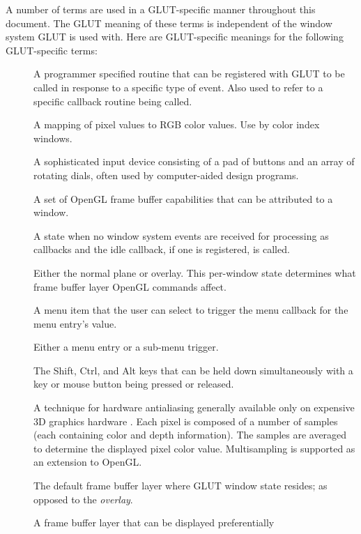 \documentclass[titlepage,twoside]{article}
\begin{document}
A number of terms are used in a GLUT-specific manner throughout this
document.  The GLUT meaning of these terms is independent of the
window system GLUT is used with.  Here are GLUT-specific
meanings for the following GLUT-specific terms:
\begin{description}
\item[{\em {}}]  A programmer specified routine that can be
registered with GLUT to be called in response to a specific type
of event.  Also used to refer to a specific callback routine
being called.
\item[{\em {}}]  A mapping of pixel values to RGB color values.
  Use by color index windows.
\item[{\em {}}]  A sophisticated input device
consisting of a pad of buttons and an array of rotating dials, often
used by computer-aided design programs.
\item[{\em {}}]  A set of OpenGL frame buffer capabilities
that can be attributed to a window.
\item[{\em {}}]  A state when no window system events are received
for processing as callbacks and the idle callback, if one is registered,
is called.
\item[{\em {}}]  Either the normal plane or overlay.  This
per-window state determines what frame buffer layer OpenGL commands affect.
\item[{\em {}}]  A menu item that the user can select to
trigger the menu callback for the menu entry's value.
\item[{\em {}}]  Either a menu entry or a sub-menu trigger.
\item[{\em {}}]  The Shift, Ctrl, and Alt keys that can be held down
simultaneously with a key or mouse button being pressed or released.
\item[{\em {}}]  A technique for hardware antialiasing
generally available only on expensive 3D graphics hardware \cite{akeley93}.  Each
pixel is composed of a number of samples (each containing color and
depth information).  The samples are averaged to determine the
displayed pixel color value.  Multisampling is supported as an
extension to OpenGL.
\item[{\em {}}]  The default frame buffer layer where GLUT window
state resides; as opposed to the {\em overlay}.
\item[{\em {}}]  A frame buffer layer that can be displayed preferentially

\end{description}
\end{document}
